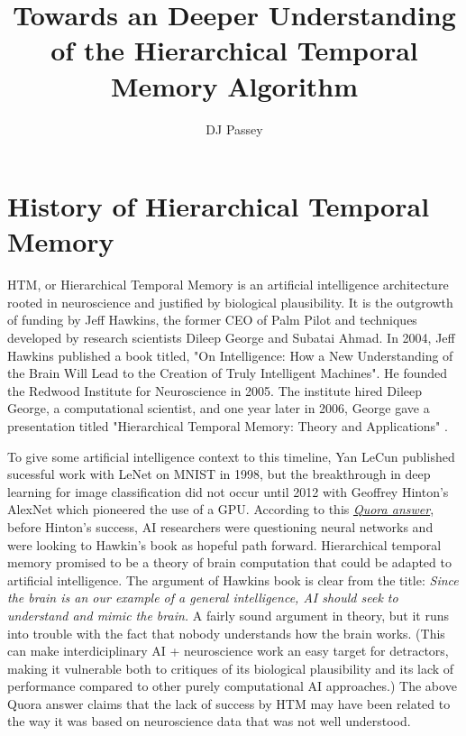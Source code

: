 \documentclass{article}
\begin{document}
 
\title{Towards an Deeper Understanding of the Hierarchical Temporal Memory Algorithm}
\author{DJ Passey}
\maketitle

\section*{History of Hierarchical Temporal Memory}
HTM, or Hierarchical Temporal Memory is an artificial intelligence architecture rooted in neuroscience and justified by biological plausibility. It is the outgrowth of funding by Jeff Hawkins, the former CEO of Palm Pilot and techniques developed by research scientists Dileep George and Subatai Ahmad. In 2004, Jeff Hawkins published a book titled, "On Intelligence: How a New Understanding of the Brain Will Lead to the Creation of Truly Intelligent Machines". He founded the Redwood Institute for Neuroscience in 2005. The institute hired Dileep George, a computational scientist, and one year later in 2006, George gave a presentation titled "Hierarchical Temporal Memory: Theory and Applications" \cite{George2006}. 

To give some artificial intelligence context to this timeline, Yan LeCun published sucessful work with LeNet on MNIST in 1998, but the breakthrough in deep learning for image classification did not occur until 2012 with Geoffrey Hinton's AlexNet which pioneered the use of a GPU. According to this \textit{ \href{https://qr.ae/pvFssm}{Quora answer}}, before Hinton's success, AI researchers were questioning neural networks and were looking to Hawkin's book as hopeful path forward. Hierarchical temporal memory promised to be a theory of brain computation that could be adapted to artificial intelligence. The argument of Hawkins book is clear from the title: \textit{Since the brain is an our example of a general intelligence, AI should seek to understand and mimic the brain.} A fairly sound argument in theory, but it runs into trouble with the fact that nobody understands how the brain works. (This can make interdiciplinary AI + neuroscience work an easy target for detractors, making it vulnerable both to critiques of its biological plausibility and its lack of performance compared to other purely computational AI approaches.) The above Quora answer claims that the lack of success by HTM may have been related to the way it was based on neuroscience data that was not well understood.
\end{document}
